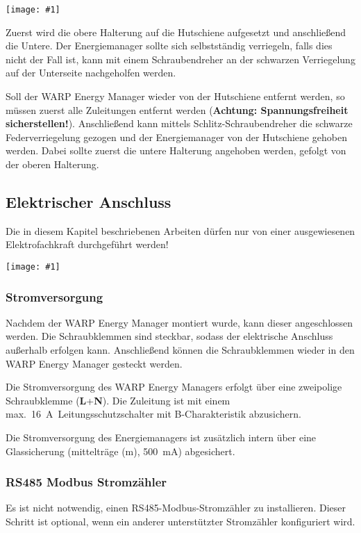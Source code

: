 \documentclass[a4paper,10pt]{article}
\newcommand{\hint}[1]{\begin{tcolorbox}[colback=boxgray,colframe=black,coltext=
white,title=Hinweis,left*=2mm,right*=2mm,boxsep=1mm,bottom=1mm,top=1mm]#1\end{tcolorbox}}
\newcommand{\gfx}[1]{\texttt{[image: \#1]}}
\begin{document}
\begin{multicols*}{2}
	\gfx{./img/wem_mounting.jpg}

	Zuerst wird die obere Halterung auf die Hutschiene aufgesetzt und anschließend
	die Untere. Der Energiemanager sollte sich selbstständig verriegeln, falls dies
	nicht der Fall ist, kann mit einem Schraubendreher an der schwarzen Verriegelung
	auf der Unterseite nachgeholfen werden.

	Soll der WARP Energy Manager wieder von der Hutschiene entfernt werden, so
	müssen zuerst alle Zuleitungen entfernt werden (\textbf{Achtung: Spannungsfreiheit
	sicherstellen!}). Anschließend kann mittels Schlitz-Schraubendreher die schwarze
	Federverriegelung gezogen und der Energiemanager von der Hutschiene
	gehoben werden. Dabei sollte zuerst die untere Halterung angehoben werden,
	gefolgt von der oberen Halterung.

	\subsection{Elektrischer Anschluss}
	\hint{Die in diesem Kapitel beschriebenen Arbeiten dürfen nur von einer ausgewiesenen
		Elektrofachkraft durchgeführt werden!}

	\gfx{./img/wem_connections.jpg}


	\subsubsection{Stromversorgung}
	Nachdem der WARP Energy Manager montiert wurde, kann dieser angeschlossen werden.
	Die Schraubklemmen sind steckbar, sodass der elektrische Anschluss
	außerhalb erfolgen kann. Anschließend können die Schraubklemmen wieder in
	den WARP Energy Manager gesteckt werden.

	Die Stromversorgung des WARP Energy Managers erfolgt über eine zweipolige
	Schraubklemme (\textbf{L}+\textbf{N}). Die Zuleitung ist mit einem
	max.~\SI{16}{\ampere}~Leitungsschutzschalter mit B-Charakteristik abzusichern.

	Die Stromversorgung des Energiemanagers ist zusätzlich intern über eine Glassicherung
	(mittelträge (m), \SI{500}{\milli\ampere}) abgesichert.
    
    
    \subsubsection{RS485 Modbus Stromzähler}
	\hint{Es ist nicht notwendig, einen RS485-Modbus-Stromzähler zu installieren. Dieser
	Schritt ist optional, wenn ein anderer unterstützter Stromzähler konfiguriert
	wird.}


\end{multicols*}
\end{document}
